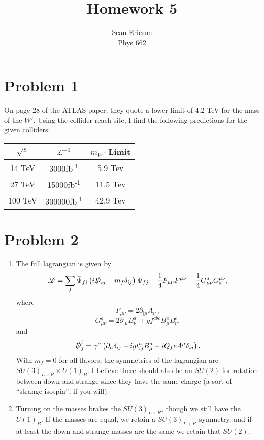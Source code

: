 \documentclass[12pt]{article}
\newcommand{\txtsup}[1]{\textsuperscript{#1}}
\begin{document}
\title{Homework 5}
\author{Sean Ericson \\ Phys 662}
\maketitle

\section*{Problem 1}
On page 28 of the ATLAS paper, they quote a lower limit of 4.2 TeV for the mass of the $W'$. Using the collider reach site, I find the following predictions for the given colliders:
\begin{table}[h]
    \centering
    \begin{tabular}{c c c}
        $\sqrt{s}$ & $\mathcal{L}^{-1}$ & $m_{W'}$ Limit \\
        \hline
        14 TeV & 3000fb\txtsup{-1} & 5.9 Tev \\
        27 TeV & 15000fb\txtsup{-1} & 11.5 Tev \\
        100 TeV & 300000fb\txtsup{-1} & 42.9 Tev
    \end{tabular}
\end{table}

\section*{Problem 2}
\begin{enumerate}[label=(\alph*)]
    \item The full lagrangian is given by
    \[ \mathscr{L} = \sum_f \bar{\Psi}_{fi}\left(i\slashed{D}_{ij} - m_f\delta_{ij}\right)\Psi_{fj} - \frac{1}{4}F_{\mu\nu}F^{\mu\nu} - \frac{1}{4}G_{\mu\nu}^aG_a^{\mu\nu}, \]
    where 
    \[ F_{\mu\nu} = 2\partial_{[\mu}A_{\nu]}, \]
    \[ G_{\mu\nu}^a = 2\partial_{[\mu}B_{\nu]}^a + gf^{abc}B_\mu^aB_\nu^c, \]
    and 
    \[ \slashed{D}_j^i = \gamma^\mu\left(\partial_\mu\delta_{ij} - igt_{ij}^aB_\mu^a - iQ_feA^\mu\delta_{ij}\right). \]
    With $m_f = 0$ for all flavors, the symmetries of the lagrangian are $SU(3)_{L\times R}\times U(1)_{B}$. I believe there should also be an $SU(2)$ for rotation between down and strange since they have the same charge (a sort of ``strange isospin'', if you will).

    \item Turning on the masses brakes the $SU(3)_{L\times R}$, though we still have the $U(1)_B$. If the masses are equal, we retain a $SU(3)_{L+R}$ symmetry, and if at least the down and strange masses are the same we retain that $SU(2)$.
\end{enumerate}
\end{document}
